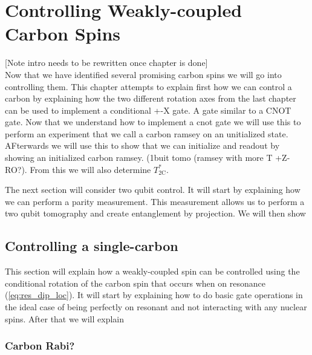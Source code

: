 \chapter{Controlling Weakly-coupled Carbon Spins}
[Note intro needs to be rewritten once chapter is done]\\
Now that we have identified several promising carbon spins we will go into controlling them.
This chapter attempts to explain first how we can control a carbon by explaining how the two different rotation axes from the last chapter can be used to implement a conditional +-X gate. A gate similar to a CNOT gate.
Now that we understand how to implement a cnot gate we will use this to perform an experiment that we call a carbon ramsey on an unitialized state.
AFterwards we will use this to show that we can initialize and readout by showing an initialized carbon ramsey. (1buit tomo (ramsey with more T +Z-RO?).
From this we will also determine $T_{2 \mathrm{C}}^*$.

The next section will consider two qubit control.
It will start by explaining how we can perform a parity measurement. This measurement allows us to perform a two qubit tomography and create entanglement by projection.
We will then show

\section{Controlling a single-carbon}
This section will explain how a weakly-coupled spin can be controlled using the conditional rotation of the carbon spin that occurs when on resonance (\cref{eq:res_dip_loc}).
It will start by explaining how to do basic gate operations in the ideal case of being perfectly on resonant and not interacting with any nuclear spins.
After that we will explain

\subsection{Carbon Rabi?}

